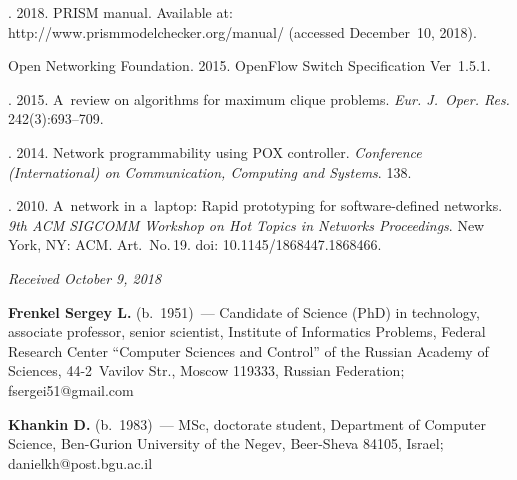 \begin{multicols}{2}
{{\begin{thebibliography}{99}
. 2018. 
{PRISM manual}. Available at:
{\sf http://www.\linebreak prismmodelchecker.org/manual/}
(accessed December~10, 2018).

{Open Networking Foundation}. 2015. 
OpenFlow Switch Specification Ver~1.5.1. 


. 2015. 
A~review on algorithms for maximum clique problems. 
\textit{Eur. J.~Oper. Res.} 242(3):693--709.

. 2014. 
Network programmability using POX controller. 
\textit{Conference (International) on Communication, Computing and Systems}.
138.

. 2010. 
A~network in a~laptop: Rapid prototyping for software-defined networks. 
\textit{9th ACM SIGCOMM Workshop on Hot Topics in Networks Proceedings}. 
New York, NY: ACM.  Art.\ No.\,19. doi: 10.1145/1868447.1868466.
\end{thebibliography} } }

\end{multicols}

\vspace*{-9pt}

\hfill{\small\textit{Received October 9, 2018}}

\vspace*{-22pt}

\Contr

\vspace*{-3pt}

\noindent
\textbf{Frenkel Sergey L.} (b.\ 1951)~--- 
Candidate of Science (PhD) in technology, associate professor, 
senior scientist, Institute of Informatics Problems, Federal Research Center 
``Computer Sciences and Control'' of the Russian Academy of Sciences, 
44-2~Vavilov Str., Moscow 119333, Russian Federation; \mbox{fsergei51@gmail.com}

\vspace*{1pt}

\noindent
\textbf{Khankin D.} (b.\ 1983)~--- MSc, doctorate student, Department of Computer 
Science, Ben-Gurion University of the Negev, Beer-Sheva 84105, Israel; 
\mbox{danielkh@post.bgu.ac.il}

\vspace*{4pt}


